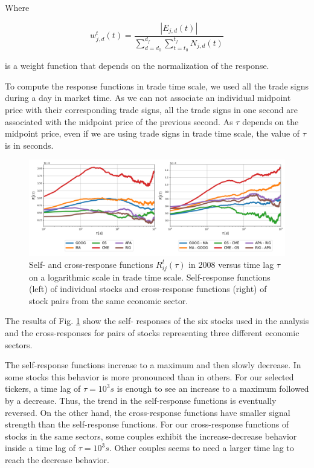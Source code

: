 Where

\begin{equation}\label{eq:trade_weight}
    w_{j,d}^{t}\left(t\right) = \frac{\left|E_{j,d}\left(t\right)\right|}
    {\sum_{d=d_{0}}^{d_{f}}\sum_{t=t_{0}}^{t_{f}}N_{j,d} \left(t\right)}
\end{equation}

is a weight function that depends on the normalization of the response.

To compute the response functions in trade time scale, we used all the trade
signs during a day in market time. As we can not associate an individual
midpoint price with their corresponding trade signs, all the trade signs in one
second are associated with the midpoint price of the previous second.
As $\tau$ depends on the midpoint price, even if we are using trade signs in
trade time scale, the value of $\tau$ is in seconds.

\begin{figure}[htbp]
    \centering
    \includegraphics[width=\textwidth]
    {figures/03_responses_trade_scale_2008.png}
    \caption{Self- and cross-response functions
             $R^{t}_{ij}\left(\tau\right)$ in 2008 versus time lag $\tau$ on a
             logarithmic scale in trade time scale. Self-response functions
             (left) of individual stocks and cross-response functions (right)
             of stock pairs from the same economic sector.}
    \label{fig:response_function_trade_scale}
\end{figure}

The results of Fig. \ref{fig:response_function_trade_scale} show the self-
responses of the six stocks used in the analysis and the cross-responses for
pairs of stocks representing three different economic sectors.

The self-response functions increase to a maximum and then slowly decrease. In
some stocks this behavior is more pronounced than in others. For our selected
tickers, a time lag of $\tau = 10^{3}s$ is enough to see an increase to a
maximum followed by a decrease. Thus, the trend in the self-response functions
is eventually reversed.
On the other hand, the cross-response functions have smaller signal strength
than the self-response functions. For our cross-response functions of stocks in
the same sectors, some couples exhibit the increase-decrease behavior inside a
time lag of $\tau = 10^{3}s$. Other couples seems to need a larger time lag to
reach the decrease behavior.

